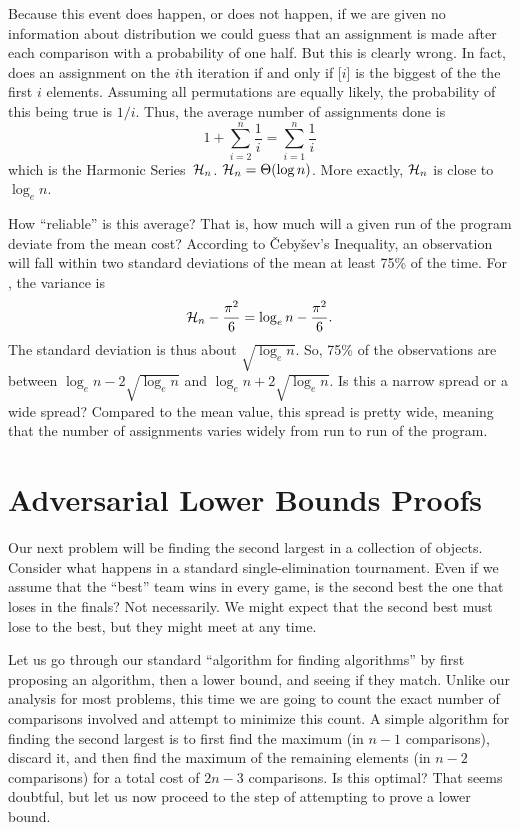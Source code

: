Because this event does happen, or does not happen,
if we are given no information about distribution we could guess that
an assignment is made after each comparison with a probability of one
half.
But this is clearly wrong.
In fact,  does an assignment on the \(i\)th iteration if
and only if [\(i\)] is the biggest of the the first \(i\)
elements.
Assuming all permutations are equally likely, the probability of this
being true is \(1/i\).
Thus, the average number of assignments done is
\[1 + \sum_{i=2}^n \frac{1}{i} = \sum_{i=1}^n \frac{1}{i}\]
\noindent which is the Harmonic Series~\({\cal H}_n\).
\({\cal H}_n = \Theta(\log n)\).
More exactly, \({\cal H}_n\) is close to \(\log_e n\).

How ``reliable'' is this average?
That is, how much will a given run of the program deviate from the
mean cost?
According to \v{C}eby\v{s}ev's Inequality, an observation will fall
within two standard deviations of the mean at least 75\% of the time.
For , the variance is
\[{\cal H}_n - \frac{\pi^2}{6} = \log_e n - \frac{\pi^2}{6}.\]
\noindent The standard deviation is thus about \(\sqrt{\log_e n}\).
So, 75\% of the observations are between \(\log_e n - 2\sqrt{\log_e n}\)
and \(\log_e n + 2\sqrt{\log_e n}\).
Is this a narrow spread or a wide spread?
Compared to the mean value, this spread is pretty wide, meaning
that the number of assignments varies widely from run to run of the
program.

\section{Adversarial Lower Bounds Proofs}
\label{Adversary}

Our next problem will be finding the second largest in a
collection of objects.
Consider what happens in a standard single-elimination tournament.
Even if we assume that the ``best'' team wins in every game,
is the second best the one that loses in the finals?
Not necessarily.
We might expect that the second best must lose to the best,
but they might meet at any time.

Let us go through our standard ``algorithm for finding algorithms'' by
first proposing an algorithm, then a lower bound, and seeing if they
match.
Unlike our analysis for most problems, this time we are going to count
the exact number of comparisons involved and attempt to minimize this
count.
A simple algorithm for finding the second largest is to first find the
maximum (in \(n-1\) comparisons), discard it, and then find the
maximum of the remaining elements (in \(n-2\) comparisons) for a total
cost of \(2n-3\) comparisons.
Is this optimal?
That seems doubtful, but let us now proceed to the step of attempting
to prove a lower bound.

